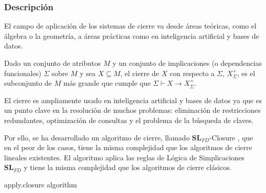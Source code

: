 \subsubsection{Descripci\'on} 



El campo de aplicaci\'on de los sistemas de cierre va desde \'areas te\'oricas, como el \'algebra o la geometr\'ia, a \'areas pr\'acticas como en inteligencia artificial y bases de datos.

Dado un conjunto de atributos \( M \) y un conjunto de implicaciones (o dependencias funcionales) \( \Sigma \) sobre \( M \) y sea \( X \subseteq M \), el cierre de \( X \) con respecto a \( \Sigma \), \( X^+_{\Sigma} \), es el subconjunto de \( M \) m\'as grande que cumple que \( \Sigma \vdash X \to X^+_{\Sigma} \).

El cierre es ampliamente usado en inteligencia artificial y bases de datos ya que es un punto clave en la resoluci\'on de muchos problemas: eliminaci\'on de restricciones redundantes, optimizaci\'on de consultas y el problema de la b\'usqueda de claves.

Por ello, se ha desarrollado un algoritmo de cierre, llamado \(\textbf{SL}_{FD}\)-Closure \cite{Mora2012a}, que en el peor de los casos, tiene la misma complejidad que los algoritmos de cierre lineales existentes.
El algoritmo aplica las reglas de L\'ogica de Simplicaciones \(\textbf{SL}_{FD}\) \cite{Cordero2002} y tiene la misma complejidad que los algoritmos de cierre cl\'asicos.

\IncMargin{1em}
\begin{algorithm}[h]
    \SetAlgoLined
    \LinesNumbered
    \DontPrintSemicolon
    \caption{apply.closure algorithm}\label{alg:2}
\end{algorithm}\DecMargin{1em}
\bigskip

